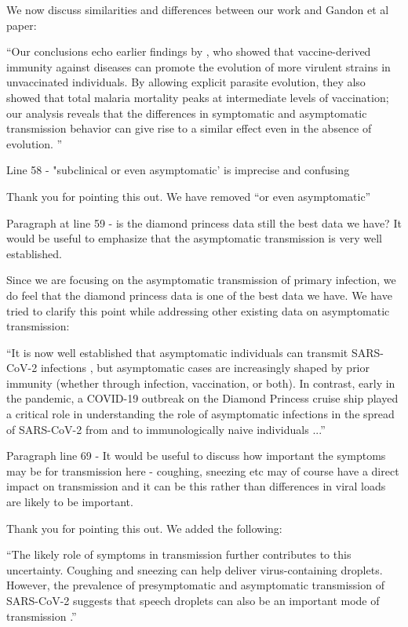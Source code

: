\documentclass[12pt]{article}
\newcommand{\revtext}{\textsf}
\begin{document}
We now discuss similarities and differences between our work and Gandon et al paper:

``Our conclusions echo earlier findings by \cite{gandon2001imperfect}, who showed that vaccine-derived immunity against diseases can promote the evolution of more virulent strains in unvaccinated individuals.
By allowing explicit parasite evolution, they also showed that total malaria mortality peaks at intermediate levels of vaccination; our analysis reveals that the differences in symptomatic and asymptomatic transmission behavior can give rise to a similar effect even in the absence of evolution.  ''

\revtext{Line 58 - "subclinical or even asymptomatic' is imprecise and confusing}

Thank you for pointing this out. We have removed ``or even asymptomatic''

\revtext{Paragraph at line 59 - is the diamond princess data still the best data we have? It would be useful to emphasize that the asymptomatic transmission is very well established.}

Since we are focusing on the asymptomatic transmission of primary infection, we do feel that the diamond princess data is one of the best data we have. We have tried to clarify this point while addressing other existing data on asymptomatic transmission: 

``It is now well established that asymptomatic individuals can transmit SARS-CoV-2 infections \citep{gao2021role,johansson2021sars,subramanian2021quantifying,koelle2022changing,lizewski2022navy}, but asymptomatic cases are increasingly shaped by prior immunity (whether through infection, vaccination, or both).
In contrast, early in the pandemic, a COVID-19 outbreak on the Diamond Princess cruise ship played a critical role in understanding the role of asymptomatic infections in the spread of SARS-CoV-2 from and to immunologically naive individuals ...''

\revtext{Paragraph line 69 - It would be useful to discuss how important the symptoms may be for transmission here - coughing, sneezing etc may of course have a direct impact on transmission and it can be this rather than differences in viral loads are likely to be important.}

Thank you for pointing this out. We added the following:

``The likely role of symptoms in transmission further contributes to this uncertainty.
Coughing and sneezing can help deliver virus-containing droplets. However, the prevalence of presymptomatic and asymptomatic transmission of SARS-CoV-2 suggests that speech droplets can also be an important mode of transmission \citep{stadnytskyi2021breathing}.''


\end{document}
